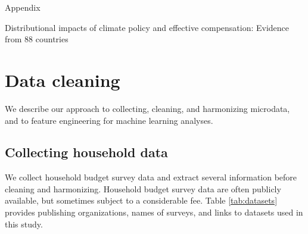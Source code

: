 \documentclass[12pt, a4paper]{article}
\begin{document}
\clearpage

\begin{refcontext}[sorting=nyt]
\printbibliography
\end{refcontext}

\clearpage

\appendix 
\begin{refsection}
{\Huge Appendix} \label{sec:appendix}

Distributional impacts of climate policy and effective compensation: Evidence from 88 countries

\clearpage
\section{Data cleaning} \label{sec:cleaning}

We describe our approach to collecting, cleaning, and harmonizing microdata, and to feature engineering for machine learning analyses.

\subsection{Collecting household data}\label{sec:cleaning_1}

We collect household budget survey data and extract several information before cleaning and harmonizing. Household budget survey data are often publicly available, but sometimes subject to a considerable fee. Table \ref{tab:datasets} provides publishing organizations, names of surveys, and links to datasets used in this study.


\end{refsection}
\end{document}
